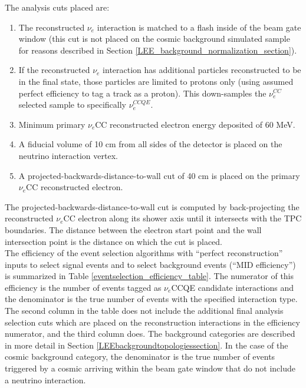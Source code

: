The analysis cuts placed are:
\begin{enumerate}
\item The reconstructed $\nu_e$ interaction is matched to a flash inside of the beam gate window (this cut is not placed on the cosmic background simulated sample for reasons described in Section \ref{LEE_background_normalization_section}).
\item If the reconstructed $\nu_e$ interaction has additional particles reconstructed to be in the final state, those particles are limited to protons only (using assumed perfect efficiency to tag a track as a proton). This down-samples the $\nu_e^{CC}$ selected sample to specifically $\nu_e^{CCQE}$.
\item Minimum primary $\nu_e$CC reconstructed electron energy deposited of 60 MeV.
\item A fiducial volume of 10 cm from all sides of the detector is placed on the neutrino interaction vertex.
\item A projected-backwards-distance-to-wall cut of 40 cm is placed on the primary $\nu_e$CC reconstructed electron.
\end{enumerate}
The projected-backwards-distance-to-wall cut is computed by back-projecting the reconstructed $\nu_e$CC electron along its shower axis until it intersects with the TPC boundaries. The distance between the electron start point and the wall intersection point is the distance on which the cut is placed.\\


The efficiency of the event selection algorithms with ``perfect reconstruction'' inputs to select signal events and to select background events (``MID efficiency'') is summarized in Table \ref{eventselection_efficiency_table}. The numerator of this efficiency is the number of events tagged as $\nu_e$CCQE candidate interactions and the denominator is the true number of events with the specified interaction type. The second column in the table does not include the additional final analysis selection cuts which are placed on the reconstruction interactions in the efficiency numerator, and the third column does. The background categories are described in more detail in Section \ref{LEEbackgroundtopologiessection}. In the case of the cosmic background category, the denominator is the true number of events triggered by a cosmic arriving within the beam gate window that do not include a neutrino interaction.\\


